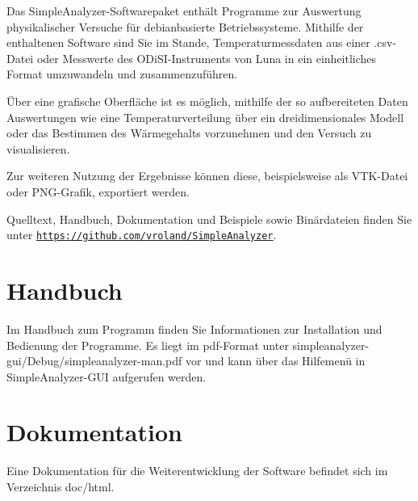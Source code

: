 Das Simple\-Analyzer-\/\-Softwarepaket enthält Programme zur Auswertung physikalischer Versuche für debianbasierte Betriebssysteme. Mithilfe der enthaltenen Software sind Sie im Stande, Temperaturmessdaten aus einer .csv-\/\-Datei oder Messwerte des O\-Di\-S\-I-\/\-Instruments von Luna in ein einheitliches Format umzuwandeln und zusammenzuführen.

Über eine grafische Oberfläche ist es möglich, mithilfe der so aufbereiteten Daten Auswertungen wie eine Temperaturverteilung über ein dreidimensionales Modell oder das Bestimmen des Wärmegehalts vorzunehmen und den Versuch zu visualisieren.

Zur weiteren Nutzung der Ergebnisse können diese, beispielsweise als V\-T\-K-\/\-Datei oder P\-N\-G-\/\-Grafik, exportiert werden.

Quelltext, Handbuch, Dokumentation und Beispiele sowie Binärdateien finden Sie unter \href{https://github.com/vroland/SimpleAnalyzer}{\tt https\-://github.\-com/vroland/\-Simple\-Analyzer}.

\section*{Handbuch }

Im Handbuch zum Programm finden Sie Informationen zur Installation und Bedienung der Programme. Es liegt im pdf-\/\-Format unter simpleanalyzer-\/gui/\-Debug/simpleanalyzer-\/man.\-pdf vor und kann über das Hilfemenü in Simple\-Analyzer-\/\-G\-U\-I aufgerufen werden.

\section*{Dokumentation }

Eine Dokumentation für die Weiterentwicklung der Software befindet sich im Verzeichnis doc/html. 